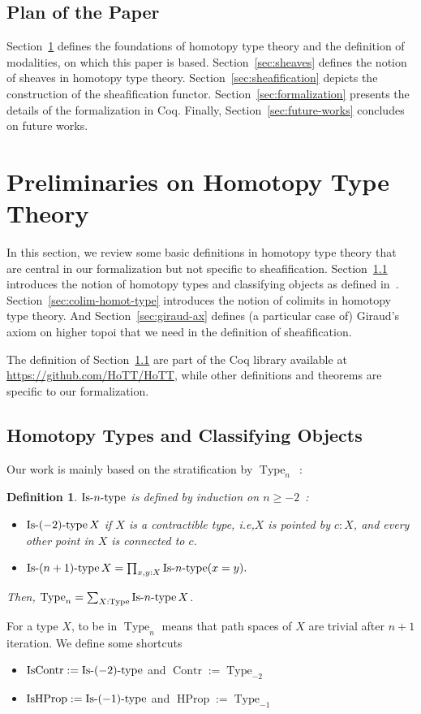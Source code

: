 \documentclass[conference]{IEEEtran}
\newtheorem{defi}[thm]{Definition}
\newcommand{\ie}{i.e,\xspace}
\DeclareMathOperator{\Type}{Type}
\DeclareMathOperator{\HProp}{HProp}
\DeclareMathOperator{\IsHProp}{IsHProp}
\DeclareMathOperator{\Contr}{Contr}
\DeclareMathOperator{\IsContr}{IsContr}
\def\mymathhyphen{{\hbox{-}}}
\newcommand{\IsType}[1]{\mathop{\mathrm{Is\mymathhyphen}#1\mathrm{\mymathhyphen
      type}} }
\begin{document}
\subsection{Plan of the Paper}

Section~\ref{sec:hott} defines the foundations of homotopy type theory
and the definition of modalities, on which this paper is based.
%
Section~\ref{sec:sheaves} defines the notion of sheaves in homotopy
type theory.
%
Section~\ref{sec:sheafification} depicts the construction of the
sheafification functor.
%
Section~\ref{sec:formalization} presents the details of the
  formalization in Coq.
%
Finally, Section~\ref{sec:future-works} concludes on future works.


\section{Preliminaries on Homotopy Type Theory}
\label{sec:hott}

In this section, we review some basic definitions in homotopy type
theory that are central in our formalization but not specific to
sheafification. 
%
Section~\ref{ssec:hott} introduces the notion of homotopy types and
classifying objects as defined in~\cite{sets_in_hott}.
%
Section~\ref{sec:colim-homot-type} introduces the notion of colimits
in homotopy type theory. 
%
And Section~\ref{sec:giraud-ax} defines (a particular case of)
Giraud's axiom on higher topoi that we need in the definition of
sheafification.

The definition of Section~\ref{ssec:hott} are part of the Coq library
available at \url{https://github.com/HoTT/HoTT}, while other definitions
and theorems are specific to our formalization. 


 \subsection{Homotopy Types and Classifying Objects}
\label{ssec:hott}

Our work is mainly based on the stratification by $\Type_n$~:
\begin{defi}
  $\IsType n$ is defined by induction on $n\geqslant -2$~:
  \begin{itemize}
  \item $\IsType {(-2)} X$ if $X$ is a contractible type, \ie $X$
    is pointed by $c:X$, and every other point in $X$ is connected to $c$.
  \item $\IsType {(n+1)} X = \prod_{x,y:X} \IsType n (x=y).$
  \end{itemize}
  Then, $\Type_n = \sum_{X:\Type} \IsType n X$.
\end{defi}
For a type $X$, to be in $\Type_n$ means that path spaces of $X$ are
trivial after $n+1$ iteration.
We define some shortcuts
\begin{itemize}
\item $\IsContr := \IsType {(-2)}$ and $\Contr := \Type_{-2}$
\item $\IsHProp := \IsType {(-1)}$ and $\HProp := \Type_{-1}$
\end{itemize}
\end{document}
